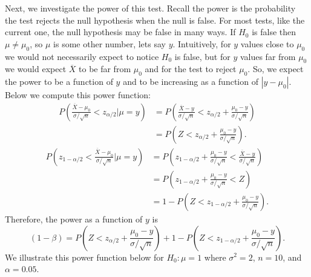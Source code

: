 \documentclass[
]{book}
\begin{document}
Next, we investigate the power of this test. Recall the power is the probability the test rejects the null hypothesis when the null is false. For most tests, like the current one, the null hypothesis may be false in many ways. If \(H_0\) is false then \(\mu\ne \mu_0\), so \(\mu\) is some other number, lets say \(y\). Intuitively, for \(y\) values close to \(\mu_0\) we would not necessarily expect to notice \(H_0\) is false, but for \(y\) values far from \(\mu_0\) we would expect \(\overline X\) to be far from \(\mu_0\) and for the test to reject \(\mu_0\). So, we expect the power to be a function of \(y\) and to be increasing as a function of \(|y-\mu_0|\). Below we compute this power function:
\begin{align*}
P\left(\frac{\overline X - \mu_0}{\sigma/\sqrt{n}} < z_{\alpha/2}|\mu = y\right) & =  P\left(\frac{\overline X - y}{\sigma/\sqrt{n}} < z_{\alpha/2}+\frac{\mu_0-y}{\sigma/\sqrt{n}}\right)\\
& = P\left(Z < z_{\alpha/2}+\frac{\mu_0-y}{\sigma/\sqrt{n}}\right).
\end{align*}
\begin{align*}
P\left(z_{1-\alpha/2} < \frac{\overline X - \mu_0}{\sigma/\sqrt{n}}|\mu = y\right) & =  P\left(z_{1-\alpha/2}+\frac{\mu_0-y}{\sigma/\sqrt{n}}<\frac{\overline X - y}{\sigma/\sqrt{n}}\right)\\
& = P\left(z_{1-\alpha/2}+\frac{\mu_0-y}{\sigma/\sqrt{n}} < Z\right)\\
& = 1-P\left(Z < z_{1-\alpha/2}+\frac{\mu_0-y}{\sigma/\sqrt{n}}\right).
\end{align*}
Therefore, the power as a function of \(y\) is
\[(1-\beta) = P\left(Z < z_{\alpha/2}+\frac{\mu_0-y}{\sigma/\sqrt{n}}\right)+1-P\left(Z < z_{1-\alpha/2}+\frac{\mu_0-y}{\sigma/\sqrt{n}}\right).\]
We illustrate this power function below for \(H_0:\mu = 1\) where \(\sigma^2 = 2\), \(n=10\), and \(\alpha = 0.05\).
\end{document}
